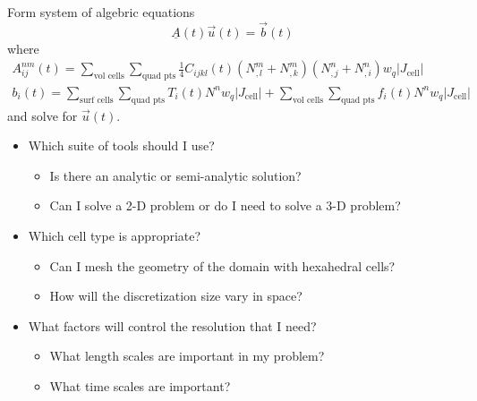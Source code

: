\documentclass[pdftex,cig,slideColor]{pp4slides}
\begin{document}

  \vfill
  Form system of algebric equations
  \begin{equation}
    \underline{A} (t) \vec{u}(t) = \vec{b}(t)
  \end{equation}
  where
  \begin{gather}
    A^{nm}_{ij}(t) = \sum_\text{vol cells} \sum_\text{quad pts} 
      \frac{1}{4} C_{ijkl}(t) (N^m_{,l} + N^m_{,k})(N^n_{,j} + N^n_{,i}) w_q |J_\text{cell}| \\
    b_i(t) =    
     \sum_\text{surf cells} \sum_\text{quad pts} T_i(t) N^n w_q |J_\text{cell}| 
    + \sum_\text{vol cells} \sum_\text{quad pts}  f_i(t) N^n w_q |J_\text{cell}|
\end{gather}
  and solve for $\vec{u}(t)$.
  \vfill


  \summary{}

  \begin{itemize}
  \item Which suite of tools should I use?
    \begin{itemize}
    \item Is there an analytic or semi-analytic solution?
    \item Can I solve a 2-D problem or do I need to solve a 3-D problem?
    \end{itemize}
  \item Which cell type is appropriate?
    \begin{itemize}
    \item Can I mesh the geometry of the domain with hexahedral cells?
    \item How will the discretization size vary in space?
    \end{itemize}
  \item What factors will control the resolution that I need?
    \begin{itemize}
    \item What length scales are important in my problem?
    \item What time scales are important?
    \end{itemize}
  \end{itemize}


\end{document}
